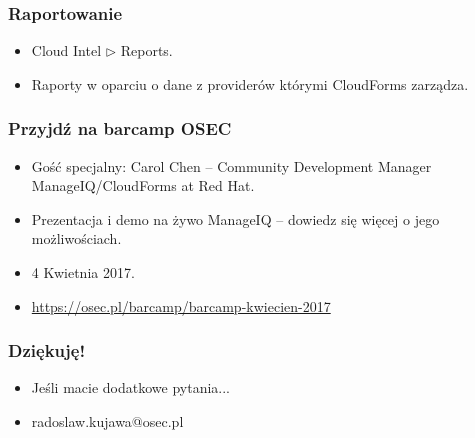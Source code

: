 \documentclass[dvipsnames,table]{beamer}
\newcommand{\tri}{$\triangleright$ }
\begin{document}
\begin{frame}
\frametitle{Raportowanie}
\begin{itemize}
	\item Cloud Intel \tri Reports.
	\item Raporty w oparciu o dane z providerów którymi CloudForms zarządza. 
\end{itemize}
\end{frame}

\begin{frame}
\frametitle{Przyjdź na barcamp OSEC}
\begin{itemize}
	\item Gość specjalny: Carol Chen -- Community Development Manager ManageIQ/CloudForms at Red Hat.
	\item Prezentacja i demo na żywo ManageIQ -- dowiedz się więcej o jego możliwościach.
	\item 4 Kwietnia 2017.
	\item \url{https://osec.pl/barcamp/barcamp-kwiecien-2017}
\end{itemize}
\end{frame}

\begin{frame}
\frametitle{Dziękuję!}
\begin{itemize}
	\item Jeśli macie dodatkowe pytania...
	\item radoslaw.kujawa@osec.pl
\end{itemize}
\end{frame}
\end{document}
